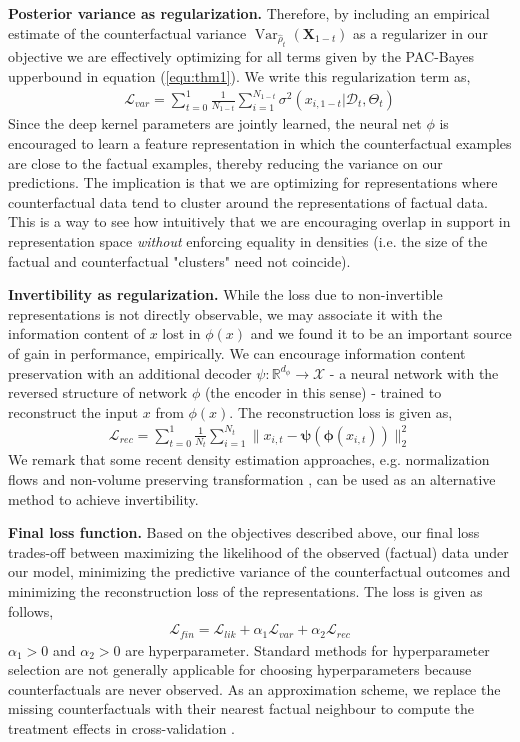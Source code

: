 \documentclass[twoside]{article}
\newcommand{\Var}{\mathop{\mathrm{Var}}}
\begin{document}
\textbf{Posterior variance as regularization.}
Therefore, by including an empirical estimate of the counterfactual variance ${\Var}_{\hat{\rho}_t}(\mathbf{X}_{1-t})$ as a regularizer in our objective we are effectively optimizing for all terms given by the PAC-Bayes upperbound in equation (\ref{equ:thm1}). We write this regularization term as,
\begin{align}
    \mathcal L_{var} = \sum_{t=0}^1 \frac{1}{N_{1-t}} \sum_{i=1}^{N_{1-t}}\sigma^2(x_{i,1-t}|\mathcal{D}_t,\Theta_t)
\end{align}
Since the deep kernel parameters are jointly learned, the neural net $\phi$ is encouraged to learn a feature representation in which the counterfactual examples are close to the factual examples, thereby reducing the variance on our predictions. The implication is that we are optimizing for representations where counterfactual data tend to cluster around the representations of factual data. This is a way to see how intuitively that we are encouraging overlap in support in representation space \textit{without} enforcing equality in densities (i.e. the size of the factual and counterfactual "clusters" need not coincide). 

\textbf{Invertibility as regularization.}
While the loss due to non-invertible representations is not directly observable, we may associate it with the information content of $x$ lost in $\phi(x)$ and we found it to be an important source of gain in performance, empirically. We can encourage information content preservation with an additional decoder $\psi:\mathbb R^{d_{\phi}} \rightarrow \mathcal X$ - a neural network with the reversed structure of network $\phi$ (the encoder in this sense) - trained to reconstruct the input $x$ from $\phi(x)$. The reconstruction loss is given as,
\begin{align}
    \mathcal L_{rec} = \sum_{t=0}^1 \frac{1}{N_t}\sum_{i=1}^{N_t}\|x_{i,t}-\mathbf{\psi}(\mathbf{\phi}(x_{i,t}))\|_{2}^{2}
\end{align}
We remark that some recent density estimation approaches, e.g. normalization flows \cite{rezende2015variational} and non-volume preserving transformation \cite{dinh2016density}, can be used as an alternative method to achieve invertibility. 

\textbf{Final loss function.}  Based on the objectives described above, our final loss trades-off between maximizing the likelihood of the observed (factual) data under our model, minimizing the predictive variance of the counterfactual outcomes and minimizing the reconstruction loss of the representations. The loss is given as follows, 
\begin{align}
    \mathcal L_{fin} = \mathcal L_{lik} + \alpha_1 \mathcal L_{var} + \alpha_2 \mathcal L_{rec}
\end{align}
$\alpha_1>0$ and $\alpha_2>0$ are hyperparameter. Standard methods for hyperparameter selection are not generally applicable for choosing hyperparameters because counterfactuals are never observed. As an approximation scheme, we replace the missing counterfactuals with their nearest factual neighbour to compute the treatment effects in cross-validation \cite{shalit2017estimating}. 
\end{document}
